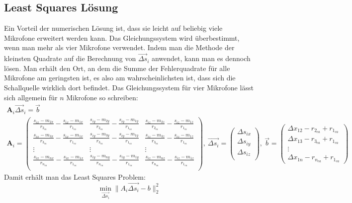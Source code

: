 \subsection{Least Squares Lösung}
Ein Vorteil der numerischen Lösung ist, dass sie leicht auf beliebig viele Mikrofone erweitert werden kann. Das Gleichungssystem wird überbestimmt, wenn man mehr als vier Mikrofone verwendet. Indem man die Methode der kleinsten Quadrate auf die Berechnung von $\vec{\Delta{s}}_i$ anwendet, kann man es dennoch lösen. Man erhält den Ort, an dem die Summe der Fehlerquadrate für alle Mikrofone am geringsten ist, es also am wahrscheinlichsten ist, dass sich die Schallquelle wirklich dort befindet.
Das Gleichungssystem für vier Mikrofone lässt sich allgemein für $n$ Mikrofone so schreiben:
\begin{gather*}
    \mathbf{A}_i\vec{\Delta{s}}_i = \vec{b}\\
    \mathbf{A}_i =
    {\begin{pmatrix}
          \frac{s_{ix} - m_{2x}}{r_{2_{ca}}} - \frac{s_{ix} - m_{1x}}{r_{1_{ca}}} & \frac{s_{iy} - m_{2y}}{r_{2_{ca}}} - \frac{s_{iy} - m_{1y}}{r_{1_{ca}}} & \frac{s_{iz} - m_{2z}}{r_{2_{ca}}} - \frac{s_{iz} - m_{1z}}{r_{1_{ca}}} \\
          \frac{s_{ix} - m_{3x}}{r_{3_{ca}}} - \frac{s_{ix} - m_{1x}}{r_{1_{ca}}} & \frac{s_{iy} - m_{3y}}{r_{3_{ca}}} - \frac{s_{iy} - m_{1y}}{r_{1_{ca}}} & \frac{s_{iz} - m_{3z}}{r_{3_{ca}}} - \frac{s_{iz} - m_{1z}}{r_{1_{ca}}} \\
          \vdots & \vdots & \vdots \\
          \frac{s_{ix} - m_{nx}}{r_{n_{ca}}} - \frac{s_{ix} - m_{1x}}{r_{1_{ca}}} & \frac{s_{iy} - m_{ny}}{r_{n_{ca}}} - \frac{s_{iy} - m_{1y}}{r_{1_{ca}}} & \frac{s_{iz} - m_{nz}}{r_{n_{ca}}} - \frac{s_{iz} - m_{1z}}{r_{1_{ca}}} \\
      \end{pmatrix}},
    ~
    \vec{\Delta{s}_i} =
    \begin{pmatrix}
        {\Delta{s}}_{ix} \\
        {\Delta{s}}_{iy} \\
        {\Delta{s}}_{iz} \\
    \end{pmatrix},
    ~
    \vec{b} =
    \begin{pmatrix}
        \Delta{x_{12}} - r_{2_{ca}} + r_{1_{ca}}\\
        \Delta{x_{13}} - r_{3_{ca}} + r_{1_{ca}}\\
        \vdots \\
        \Delta{x_{1n}} - r_{n_{ca}} + r_{1_{ca}}
    \end{pmatrix}
\end{gather*}
Damit erhält man das Least Squares Problem:
\begin{equation}
    \min_{\vec{\Delta{s}_i}}{\|A_i\vec{\Delta{s}_i} - b\|_2^2}
\end{equation}
